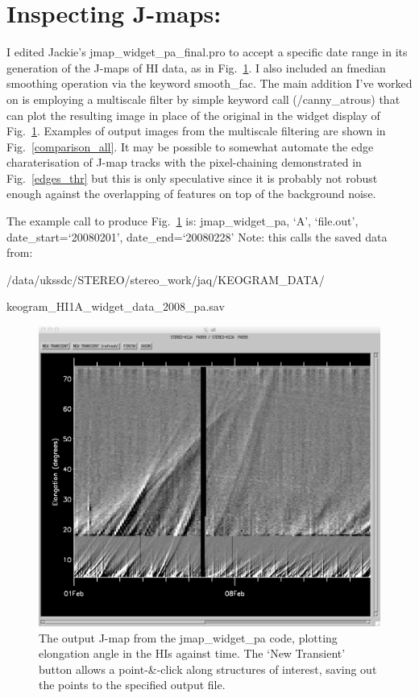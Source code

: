 \documentclass[12pt, a4paper, oneside]{article}
\begin{document}
\section{Inspecting J-maps:}

I edited Jackie's jmap\_widget\_pa\_final.pro to accept a specific date range in its generation of the J-maps of HI data, as in Fig.~\ref{jmap}. I also included an fmedian smoothing operation via the keyword smooth\_fac. The main addition I've worked on is employing a multiscale filter by simple keyword call (/canny\_atrous) that can plot the resulting image in place of the original in the widget display of Fig.~\ref{jmap}. Examples of output images from the multiscale filtering are shown in Fig.~\ref{comparison_all}. It may be possible to somewhat automate the edge charaterisation of J-map tracks with the pixel-chaining demonstrated in Fig.~\ref{edges_thr} but this is only speculative since it is probably not robust enough against the overlapping of features on top of the background noise. 

\noindent The example call to produce Fig.~\ref{jmap} is:
\newline
\newline
jmap\_widget\_pa, `A', `file.out', date\_start=`20080201', date\_end=`20080228'
\newline
\newline
Note: this calls the saved data from:

/data/ukssdc/STEREO/stereo\_work/jaq/KEOGRAM\_DATA/

keogram\_HI1A\_widget\_data\_2008\_pa.sav


\begin{figure}[]
\centering
\includegraphics[width=\textwidth]{jmap.png}
\caption{The output J-map from the jmap\_widget\_pa code, plotting elongation angle in the HIs against time. The `New Transient' button allows a point-\&-click along structures of interest, saving out the points to the specified output file.}
\label{jmap}
\end{figure}
\end{document}
